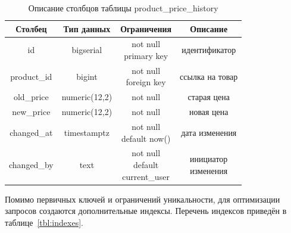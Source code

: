 \begin{table}[H]
    \caption{Описание столбцов таблицы product\_price\_history}
    \label{tbl:t_price_history}
    \rpzcompacttable
    \begin{tabular}[]{|c|c|c|c|}
        \hline
        \textbf{Столбец} & \textbf{Тип данных} & \textbf{Ограничения} & \textbf{Описание} \\ \hline
        id & bigserial & \makecell{not null \\ primary key} & идентификатор \\ \hline
        product\_id & bigint & \makecell{not null \\ foreign key} & ссылка на товар \\ \hline
        old\_price & numeric(12,2) & not null & старая цена \\ \hline
        new\_price & numeric(12,2) & not null & новая цена \\ \hline
        changed\_at & timestamptz & \makecell{not null \\ default now()} & дата изменения \\ \hline
        changed\_by & text & \makecell{not null \\ default\\current\_user} & \makecell{инициатор\\изменения} \\ \hline
    \end{tabular}
\end{table}

Помимо первичных ключей и ограничений уникальности, для оптимизации запросов создаются дополнительные индексы. Перечень индексов приведён в таблице~\ref{tbl:indexes}.


